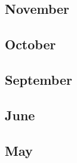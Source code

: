 \documentclass[12pt]{article}
\begin{document}
\subsection{November}
\begin{refsection}
    \nocite{liang_holistic_2023}
    \nocite{workshop_bloom_2023}
    \nocite{taylor_galactica_2022}
    \printbibliography[heading=none]
\end{refsection}

\subsection{October}
\begin{refsection}
    \nocite{chung_scaling_2022}
    \nocite{zeng_glm-130b_2023}
    \printbibliography[heading=none]
\end{refsection}

\subsection{September}
\begin{refsection}
    \nocite{glaese_improving_2022}
    \printbibliography[heading=none]
\end{refsection}

\subsection{June}
\begin{refsection}
    \nocite{wei_emergent_nodate}
    \nocite{hao2022languagemodelsgeneralpurposeinterfaces}
    \nocite{noauthor_googlebig-bench_2025}
    \printbibliography[heading=none]
\end{refsection}


\subsection{May}
\begin{refsection}
    \nocite{zhang2022optopenpretrainedtransformer}
    \nocite{tay_unifying_2022}
    \printbibliography[heading=none]
\end{refsection}
\end{document}
